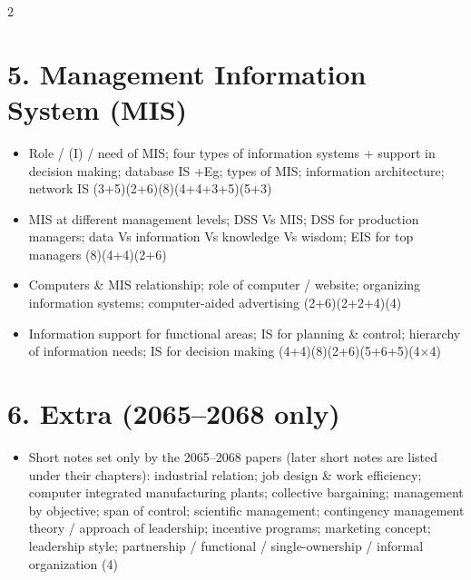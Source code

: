 \documentclass[10pt]{article}
\begin{document}
\begin{multicols}{2}
\section*{5. Management Information System (MIS)}
\begin{itemize}
  \item Role / (I) / need of MIS; four types of information systems + support in decision making; database IS +Eg; types of MIS; information architecture; network IS \hfill (3+5)(2+6)(8)(4+4+3+5)(5+3)
  \item MIS at different management levels; DSS Vs MIS; DSS for production managers; data Vs information Vs knowledge Vs wisdom; EIS for top managers \hfill (8)(4+4)(2+6)
  \item Computers \& MIS relationship; role of computer / website; organizing information systems; computer-aided advertising \hfill (2+6)(2+2+4)(4)
  \item Information support for functional areas; IS for planning \& control; hierarchy of information needs; IS for decision making \hfill (4+4)(8)(2+6)(5+6+5)(4$\times$4)
\end{itemize}

\section*{6. Extra (2065--2068 only)}
\begin{itemize}
  \item Short notes set only by the 2065--2068 papers (later short notes are listed under their chapters): industrial relation; job design \& work efficiency; computer integrated manufacturing plants; collective bargaining; management by objective; span of control; scientific management; contingency management theory / approach of leadership; incentive programs; marketing concept; leadership style; partnership / functional / single-ownership / informal organization \hfill (4)
\end{itemize}

\end{multicols}
\end{document}
